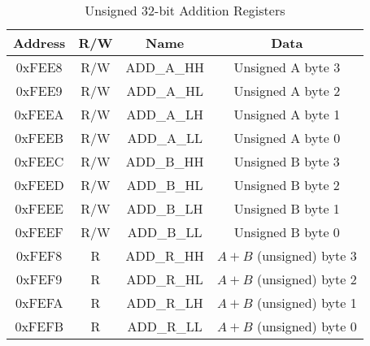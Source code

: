 \begin{table}[ht]
    \begin{center}
        \begin{tabular}{|c|c|c|c|} \hline
            Address & R/W & Name & Data \\\hline\hline
            0xFEE8 & R/W & ADD\_A\_HH & Unsigned A byte 3 \\\hline
            0xFEE9 & R/W & ADD\_A\_HL & Unsigned A byte 2 \\\hline
            0xFEEA & R/W & ADD\_A\_LH & Unsigned A byte 1 \\\hline
            0xFEEB & R/W & ADD\_A\_LL & Unsigned A byte 0 \\\hline
            0xFEEC & R/W & ADD\_B\_HH & Unsigned B byte 3 \\\hline
            0xFEED & R/W & ADD\_B\_HL & Unsigned B byte 2 \\\hline
            0xFEEE & R/W & ADD\_B\_LH & Unsigned B byte 1 \\\hline
            0xFEEF & R/W & ADD\_B\_LL & Unsigned B byte 0 \\\hline
            0xFEF8 & R   & ADD\_R\_HH & $A + B$ (unsigned) byte 3 \\\hline
            0xFEF9 & R   & ADD\_R\_HL & $A + B$ (unsigned) byte 2 \\\hline
            0xFEFA & R   & ADD\_R\_LH & $A + B$ (unsigned) byte 1 \\\hline
            0xFEFB & R   & ADD\_R\_LL & $A + B$ (unsigned) byte 0 \\\hline
        \end{tabular}
    \end{center}
    \caption{Unsigned 32-bit Addition Registers}
    \label{tab:math_add_reg}
\end{table}
